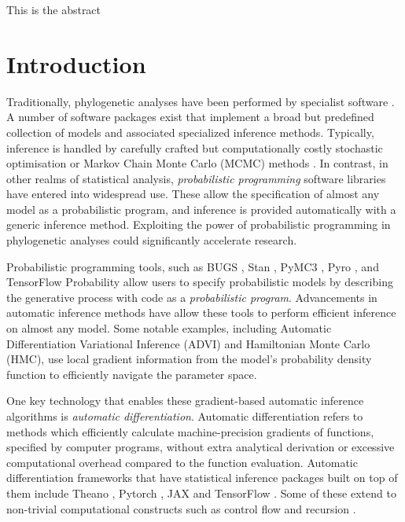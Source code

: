 
\usepackage{booktabs}

This is the abstract

\section{Introduction}

Traditionally, phylogenetic analyses have been performed by specialist software \cite{stamatakis2014raxml, drummond2012bayesian, huelsenbeck2001mrbayes}. A number of software packages exist that implement a broad but predefined collection of models and associated specialized inference methods. Typically, inference is handled by carefully crafted but computationally costly stochastic optimisation or Markov Chain Monte Carlo (MCMC) methods \cite{metropolis1953equation, hastings1970monte}. In contrast, in other realms of statistical analysis, \textit{probabilistic programming} software libraries have entered into widespread use. These allow the specification of almost any model as a probabilistic program, and inference is provided automatically with a generic inference method. Exploiting the power of probabilistic programming in phylogenetic analyses could significantly accelerate research.

Probabilistic programming tools, such as BUGS \cite{lunn2000winbugs}, Stan \cite{carpenter2017stan}, PyMC3 \cite{salvatier2016probabilistic}, Pyro \cite{bingham2019pyro}, and TensorFlow Probability \cite{dillon2017tensorflow} allow users to specify probabilistic models by describing the generative process with code as a \textit{probabilistic program}. Advancements in automatic inference methods have allow these tools to perform efficient inference on almost any model. Some notable examples, including Automatic Differentiation Variational Inference \cite{kucukelbir2017automatic} (ADVI) and Hamiltonian Monte Carlo \cite{duane1987hybrid} (HMC), use local  gradient information from the model's probability density function to efficiently navigate the parameter space.

One key technology that enables these gradient-based automatic inference algorithms is \textit{automatic differentiation}. Automatic differentiation refers to methods which efficiently calculate machine-precision gradients of functions, specified by computer programs, without extra analytical derivation or excessive computational overhead compared to the function evaluation. Automatic differentiation frameworks that have statistical inference packages built on top of them include Theano \cite{bergstra2010theano}, Pytorch \cite{paszke2019pytorch}, JAX \cite{jax2018github} and TensorFlow \cite{abadi2016tensorflow}. Some of these extend to non-trivial computational constructs such as control flow and recursion \cite{yu2018dynamic}.


